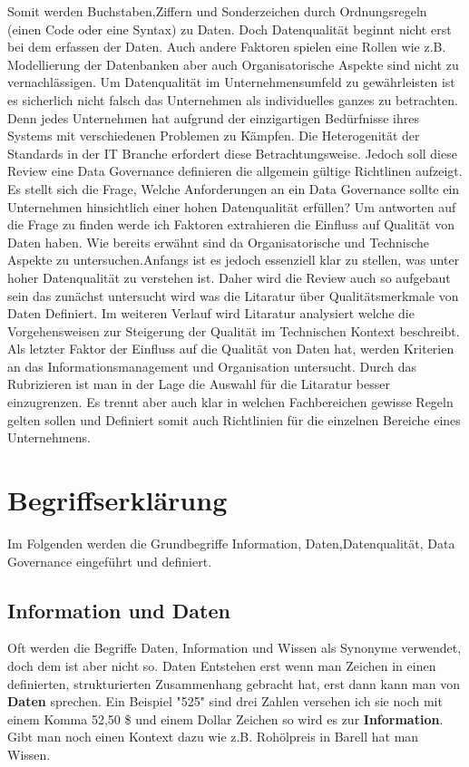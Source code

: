 \documentclass[12pt,a4paper,bibliography=totocnumbered,listof=totocnumbered]{scrartcl}
\begin{document}
Somit werden Buchstaben,Ziffern und Sonderzeichen durch Ordnungsregeln (einen Code oder eine Syntax) zu Daten.\cite{north}
Doch Datenqualität beginnt nicht erst bei dem erfassen der Daten.
Auch andere Faktoren spielen eine Rollen wie z.B. Modellierung der Datenbanken aber auch Organisatorische Aspekte sind nicht zu vernachlässigen. Um Datenqualität im Unternehmensumfeld zu gewährleisten ist es sicherlich nicht falsch das Unternehmen als individuelles ganzes zu betrachten. Denn jedes Unternehmen hat
aufgrund der einzigartigen Bedürfnisse ihres Systems mit verschiedenen Problemen zu Kämpfen. Die He­te­ro­ge­ni­tät der Standards in der IT Branche erfordert diese Betrachtungsweise. Jedoch soll diese Review eine Data Governance definieren die allgemein gültige Richtlinen aufzeigt. Es stellt sich die Frage, Welche Anforderungen an ein Data Governance sollte ein Unternehmen hinsichtlich einer hohen Datenqualität erfüllen? Um antworten auf die Frage zu finden werde ich Faktoren extrahieren die Einfluss auf Qualität von Daten haben. Wie bereits erwähnt sind da Organisatorische und Technische Aspekte zu untersuchen.Anfangs ist es jedoch essenziell klar zu stellen, was unter hoher Datenqualität zu verstehen ist. Daher wird die Review auch so aufgebaut sein das zunächst untersucht wird was die Litaratur über Qualitätsmerkmale von Daten Definiert. Im weiteren Verlauf wird Litaratur analysiert welche die Vorgehensweisen zur Steigerung der Qualität im Technischen Kontext beschreibt. Als letzter Faktor der Einfluss auf die Qualität von Daten hat, werden Kriterien an das Informationsmanagement und Organisation untersucht. Durch das Rubrizieren ist man in der Lage die Auswahl für die Litaratur besser einzugrenzen. Es trennt aber auch klar in welchen Fachbereichen gewisse Regeln gelten sollen und Definiert somit auch Richtlinien für die einzelnen Bereiche eines Unternehmens. 

\newpage

\section{Begriffserklärung}
Im Folgenden werden die Grundbegriffe Information, Daten,Datenqualität, Data Governance eingeführt und definiert.
\subsection*{Information und Daten}
Oft werden die Begriffe Daten, Information und Wissen als Synonyme verwendet, doch dem ist aber nicht so. Daten Entstehen erst wenn man Zeichen in einen definierten, strukturierten Zusammenhang gebracht hat, erst dann kann man von \textbf{Daten} sprechen. Ein Beispiel
"525" sind drei Zahlen versehen ich sie noch mit einem Komma 52,50 \$ und einem Dollar Zeichen so wird es zur \textbf{Information}.
Gibt man noch einen Kontext dazu wie z.B. Rohölpreis in Barell hat man Wissen.   
\end{document}
